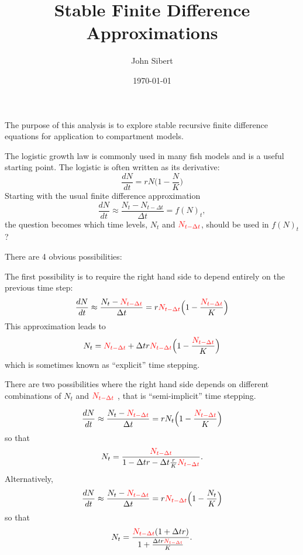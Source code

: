 \documentclass[12pt,letterpaper]{article}
\title{Stable Finite Difference Approximations}
\author{John Sibert\\
\date{\today}
}
\newcommand\doublespacing{\baselineskip=1.6\normalbaselineskip}
\newcommand\Nm{{\color{red}N_{t-\Delta t}}}
\begin{document}
\maketitle

\doublespacing

The purpose of this analysis is to explore stable recursive finite
difference equations for application to compartment models.
 
The logistic growth law is commonly used in many fish models and is a
useful starting point. 
The logistic is often written as its derivative:
\begin{equation*}
\frac{dN}{dt}= rN\Big(1-\frac{N}{K}\Big)%
\end{equation*}
Starting with the usual finite difference approximation
\begin{equation*}
\frac{dN}{dt}\approx \frac{N_t-N_{t-\Delta t}}{\Delta t} = {f(N)}_t,
\end{equation*}
the question becomes which time levels, $N_t$ and $\Nm$, should
be used  in ${f(N)}_t$?

There are 4 obvious possibilities:

The first possibility is to require the right hand side to depend entirely
on the previous time step:
\begin{equation*}
\frac{dN}{dt} \approx \frac{N_t-\Nm}{\Delta t} =
r\Nm\Big(1-\frac{\Nm}{K}\Big)
\end{equation*}
This approximation leads to
\begin{equation}
N_t = \Nm + \Delta t r \Nm\Big(1-\frac{\Nm}{K}\Big)
\label{eqn:explicit}
\end{equation}
which is sometimes known as ``explicit'' time stepping.

There are two possibilities where the right hand side depends on
different combinations of $N_t$ and $\Nm$ , that is ``semi-implicit''
time stepping.

\begin{equation*}
\frac{dN}{dt} \approx \frac{N_t-\Nm}{\Delta t} =
rN_t\Big(1-\frac{\Nm}{K}\Big)
\end{equation*}
so that
\begin{equation}
N_t = \frac{\Nm}{1-\Delta t r -\Delta t\frac{r}{K}\Nm}.
\label{eqn:implicit2a}
\end{equation}
Alternatively,
\begin{equation*}
\frac{dN}{dt} \approx \frac{N_t-\Nm}{\Delta t} =
r\Nm\Big(1-\frac{N_t}{K}\Big)
\end{equation*}
so that
\begin{equation}
N_t = \frac{\Nm(1+\Delta t r)}{1+\frac{\Delta tr\Nm}{K}}.
\label{eqn:implicit2b}
\end{equation}
\end{document}
